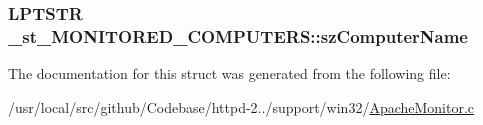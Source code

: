 \subsubsection[{\texorpdfstring{sz\+Computer\+Name}{szComputerName}}]{\setlength{\rightskip}{0pt plus 5cm}L\+P\+T\+S\+TR \+\_\+st\+\_\+\+M\+O\+N\+I\+T\+O\+R\+E\+D\+\_\+\+C\+O\+M\+P\+U\+T\+E\+R\+S\+::sz\+Computer\+Name}\hypertarget{struct__st__MONITORED__COMPUTERS_a00f2db8f87493ab31ecd00253868891f}{}\label{struct__st__MONITORED__COMPUTERS_a00f2db8f87493ab31ecd00253868891f}


The documentation for this struct was generated from the following file\+:\begin{DoxyCompactItemize}
\item 
/usr/local/src/github/\+Codebase/httpd-\/2../support/win32/\hyperlink{ApacheMonitor_8c}{Apache\+Monitor.\+c}\end{DoxyCompactItemize}
